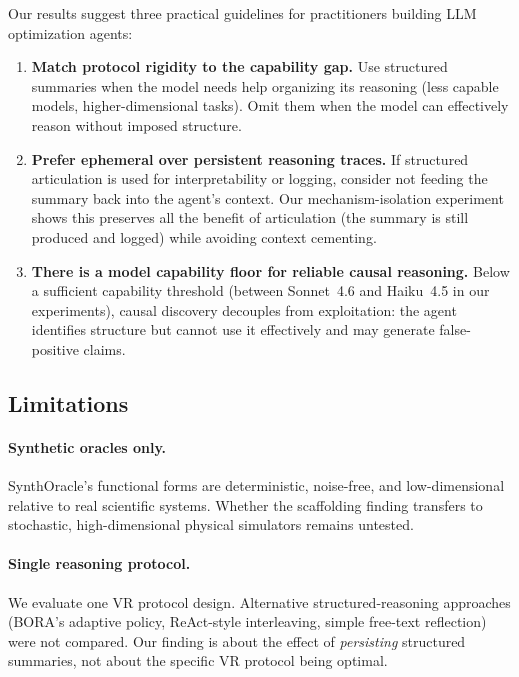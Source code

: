 \documentclass[11pt,letterpaper]{article}
\begin{document}
Our results suggest three practical guidelines for practitioners building
LLM optimization agents:

\begin{enumerate}
  \item \textbf{Match protocol rigidity to the capability gap.} Use
  structured summaries when the model needs help organizing its
  reasoning (less capable models, higher-dimensional tasks). Omit them
  when the model can effectively reason without imposed structure.

  \item \textbf{Prefer ephemeral over persistent reasoning traces.}
  If structured articulation is used for interpretability or logging,
  consider not feeding the summary back into the agent's context. Our
  mechanism-isolation experiment shows this preserves all the benefit
  of articulation (the summary is still produced and logged) while
  avoiding context cementing.

  \item \textbf{There is a model capability floor for reliable causal
  reasoning.} Below a sufficient capability threshold (between
  Sonnet~4.6 and Haiku~4.5 in our experiments), causal discovery
  decouples from exploitation: the agent identifies structure but
  cannot use it effectively and may generate false-positive claims.
\end{enumerate}

\subsection{Limitations}

\paragraph{Synthetic oracles only.} SynthOracle's functional forms are
deterministic, noise-free, and low-dimensional relative to real
scientific systems. Whether the scaffolding finding transfers to
stochastic, high-dimensional physical simulators remains untested.

\paragraph{Single reasoning protocol.} We evaluate one VR protocol
design. Alternative structured-reasoning approaches (BORA's adaptive
policy, ReAct-style interleaving, simple free-text reflection) were not
compared. Our finding is about the effect of \emph{persisting} structured
summaries, not about the specific VR protocol being optimal.
\end{document}
